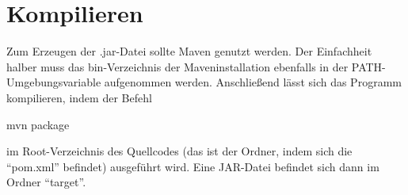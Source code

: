 \section{Kompilieren}\label{sec:kompilieren}
Zum Erzeugen der .jar-Datei sollte Maven genutzt werden.
Der Einfachheit halber muss das bin-Verzeichnis der Maveninstallation ebenfalls in der PATH-Umgebungsvariable aufgenommen werden.
Anschließend lässt sich das Programm kompilieren, indem der Befehl
\begin{center}
    \colorbox{gray!20}{
        \begin{minipage}{0.9\textwidth}
            mvn package
        \end{minipage}
    }
\end{center}
im Root-Verzeichnis des Quellcodes (das ist der Ordner, indem sich die \enquote{pom.xml} befindet) ausgeführt wird.
Eine JAR-Datei befindet sich dann im Ordner \enquote{target}.